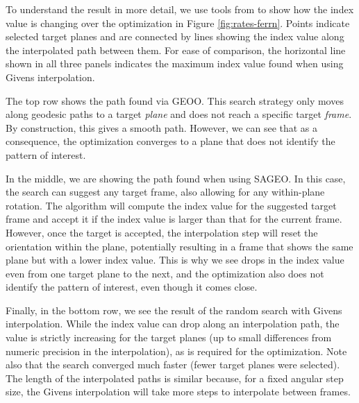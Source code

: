 To understand the result in more detail, we use tools from  \citep{ferrn} to show how the index value is changing over the optimization in Figure \ref{fig:rates-ferrn}. Points indicate selected target planes and are connected by lines showing the index value along the interpolated path between them. For ease of comparison, the horizontal line shown in all three panels indicates the maximum index value found when using Givens interpolation.

The top row shows the path found via GEOO. This search strategy only moves along geodesic paths to a target \emph{plane} and does not reach a specific target \emph{frame}. By construction, this gives a smooth path. However, we can see that as a consequence, the optimization converges to a plane that does not identify the pattern of interest.

In the middle, we are showing the path found when using SAGEO. In this case, the search can suggest any target frame, also allowing for any within-plane rotation. The algorithm will compute the index value for the suggested target frame and accept it if the index value is larger than that for the current frame. However, once the target is accepted, the interpolation step will reset the orientation within the plane, potentially resulting in a frame that shows the same plane but with a lower index value. This is why we see drops in the index value even from one target plane to the next, and the optimization also does not identify the pattern of interest, even though it comes close.

Finally, in the bottom row, we see the result of the random search with Givens interpolation. While the index value can drop along an interpolation path, the value is strictly increasing for the target planes (up to small differences from numeric precision in the interpolation), as is required for the optimization. Note also that the search converged much faster (fewer target planes were selected). The length of the interpolated paths is similar because, for a fixed angular step size, the Givens interpolation will take more steps to interpolate between frames.

